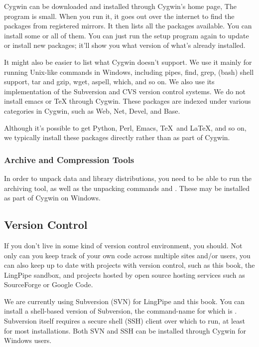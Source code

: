 Cygwin can be downloaded and installed through Cygwin's home page,
%
%
The  program is small.  When you run it, it goes out
over the internet to find the packages from registered mirrors.  It
then lists all the packages available.  You can install some or all of
them.  You can just run the setup program again to update or install
new packages; it'll show you what version of what's already installed.

It might also be easier to list what Cygwin doesn't support.  We use
it mainly for running Unix-like commands in Windows, including pipes,
find, grep, (bash) shell support, tar and gzip, wget, aspell, which,
and so on.  We also use its implementation of the Subversion and CVS
version control systems.  We do not install emacs or TeX through
Cygwin.  These packages are indexed under various categories in
Cygwin, such as Web, Net, Devel, and Base.  

Although it's possible to get Python, Perl, Emacs, \TeX\ and \LaTeX,
and so on, we typically install these packages directly rather than
as part of Cygwin.


\subsubsection{Archive and Compression Tools}

In order to unpack data and library distributions, you need to be able
to run the  archiving tool, as well as the unpacking commands
 and .  These may be installed as part of
Cygwin on Windows.


\subsection{Version Control}

If you don't live in some kind of version control environment, you should.
Not only can you keep track of your own code across multiple sites and/or
users, you can also keep up to date with projects with version control,
such as this book, the LingPipe sandbox, and projects hosted by open
source hosting services such as SourceForge or Google Code.

We are currently using Subversion (SVN) for LingPipe and this book.
You can install a shell-based version of Subversion, the command-name
for which is .  Subversion itself requires a secure shell
(SSH) client over which to run, at least for most installations.  Both
SVN and SSH can be installed through Cygwin for Windows users.

